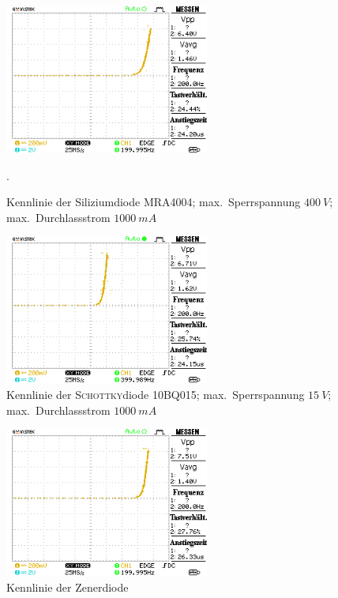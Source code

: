 \documentclass[a4paper,10pt]{article}
\numberwithin{equation}{section}
\begin{document}
\newpage
\begin{figure}[h]
	\centering
	\includegraphics[width=0.6\textwidth]{data/Kennlinie_a1_d1.BMP.png}
	\caption{Kennlinie der Siliziumdiode MRA4004; max.\ Sperrspannung $\SI{400}{V}$; max.\ Durchlassstrom $\SI{1000}{mA}$}.
	\label{fig:2.1}
\end{figure}
\begin{figure}[h]
	\centering
	\includegraphics[width=0.6\textwidth]{data/Kennlinie_a1_d2.BMP.png}
	\caption{Kennlinie der \textsc{Schottky}diode 10BQ015; max.\ Sperrspannung $\SI{15}{V}$; max.\ Durchlassstrom $\SI{1000}{mA}$}
	\label{fig:2.2}
\end{figure}
\begin{figure}[h]
	\centering
	\includegraphics[width=0.6\textwidth]{data/Kennlinie_a1_zd.BMP.png}
	\caption{Kennlinie der Zenerdiode}
	\label{fig:2.3}
\end{figure}
\end{document}
